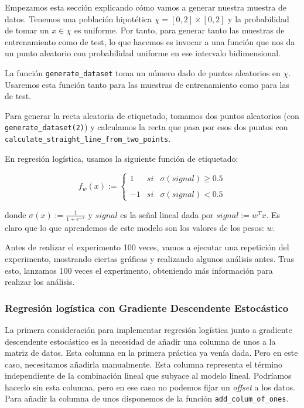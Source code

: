 \documentclass[11pt]{article}
\begin{document}
Empezamos esta sección explicando cómo vamos a generar nuestra muestra de datos. Tenemos una población hipotética $\chi = [0, 2] \times [0, 2]$ y la probabilidad de tomar un $x \in \chi$ es uniforme. Por tanto, para generar tanto las muestras de entrenamiento como de test, lo que hacemos es invocar a una función que nos da un punto aleatorio con probabilidad uniforme en ese intervalo bidimensional.

La función \lstinline{generate_dataset} toma un número dado de puntos aleatorios en $\chi$. Usaremos esta función tanto para las muestras de entrenamiento como para las de test.

Para generar la recta aleatoria de etiquetado, tomamos dos puntos aleatorios (con \lstinline{generate_dataset(2)}) y calculamos la recta que pasa por esos dos puntos con \lstinline{calculate_straight_line_from_two_points}.

En regresión logística, usamos la siguiente función de etiquetado:

$$
f_w(x):= \left\{ \begin{array}{lcc}
        1 &  si & \sigma(signal) \geq 0.5 \\
    \\ -1 &  si & \sigma(signal) < 0.5
    \end{array}
\right.
$$

donde $\sigma(x) := \frac{1}{1 + e^{-x}}$ y $signal$ es la señal lineal dada por $signal := w^T x$. Es claro que lo que aprendemos de este modelo son los valores de los pesos: $w$.

Antes de realizar el experimento 100 veces, vamos a ejecutar una repetición del experimento, mostrando ciertas gráficas y realizando algunos análisis antes. Tras esto, lanzamos 100 veces el experimento, obteniendo más información para realizar los análisis.

\subsubsection{Regresión logística con Gradiente Descendente Estocástico}

La primera consideración para implementar regresión logística junto a gradiente descendente estocástico es la necesidad de añadir una columna de unos a la matriz de datos. Esta columna en la primera práctica ya venía dada. Pero en este caso, necesitamos añadirla manualmente. Esta columna representa el término independiente de la combinación lineal que subyace al modelo lineal. Podríamos hacerlo sin esta columna, pero en ese caso no podemos fijar un \emph{offset} a los datos. Para añadir la columna de unos disponemos de la función \lstinline{add_colum_of_ones}.
\end{document}
